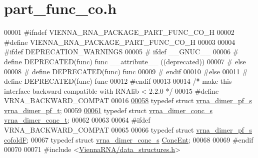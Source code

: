 \hypertarget{part__func__co_8h_source}{\section{part\+\_\+func\+\_\+co.\+h}
\label{part__func__co_8h_source}
}

\begin{DoxyCode}
00001 \textcolor{preprocessor}{#ifndef VIENNA\_RNA\_PACKAGE\_PART\_FUNC\_CO\_H}
00002 \textcolor{preprocessor}{#define VIENNA\_RNA\_PACKAGE\_PART\_FUNC\_CO\_H}
00003 
00004 \textcolor{preprocessor}{#ifdef DEPRECATION\_WARNINGS}
00005 \textcolor{preprocessor}{# ifdef \_\_GNUC\_\_}
00006 \textcolor{preprocessor}{#  define DEPRECATED(func) func \_\_attribute\_\_ ((deprecated))}
00007 \textcolor{preprocessor}{# else}
00008 \textcolor{preprocessor}{#  define DEPRECATED(func) func}
00009 \textcolor{preprocessor}{# endif}
00010 \textcolor{preprocessor}{#else}
00011 \textcolor{preprocessor}{# define DEPRECATED(func) func}
00012 \textcolor{preprocessor}{#endif}
00013 
00014 \textcolor{comment}{/* make this interface backward compatible with RNAlib < 2.2.0 */}
00015 \textcolor{preprocessor}{#define VRNA\_BACKWARD\_COMPAT}
00016 
\hypertarget{part__func__co_8h_source_l00058}{}\hyperlink{group__pf__cofold_ga444df1587c9a2ca15b8eb25188f629c3}{00058} \textcolor{keyword}{typedef} \textcolor{keyword}{struct }\hyperlink{group__pf__cofold_structvrna__dimer__pf__s}{vrna\_dimer\_pf\_s}  \hyperlink{group__pf__cofold_structvrna__dimer__pf__s}{vrna\_dimer\_pf\_t};
00059 
\hypertarget{part__func__co_8h_source_l00061}{}\hyperlink{group__pf__cofold_gac48c2723444ecfdceafcfd525ca98322}{00061} \textcolor{keyword}{typedef} \textcolor{keyword}{struct }\hyperlink{group__pf__cofold_structvrna__dimer__conc__s}{vrna\_dimer\_conc\_s}  \hyperlink{group__pf__cofold_structvrna__dimer__conc__s}{vrna\_dimer\_conc\_t};
00062 
00063 
00064 \textcolor{preprocessor}{#ifdef VRNA\_BACKWARD\_COMPAT}
00065 
00066 \textcolor{keyword}{typedef} \textcolor{keyword}{struct }\hyperlink{group__pf__cofold_structvrna__dimer__pf__s}{vrna\_dimer\_pf\_s}    \hyperlink{group__pf__cofold_structvrna__dimer__pf__s}{cofoldF};
00067 \textcolor{keyword}{typedef} \textcolor{keyword}{struct }\hyperlink{group__pf__cofold_structvrna__dimer__conc__s}{vrna\_dimer\_conc\_s}  \hyperlink{group__pf__cofold_structvrna__dimer__conc__s}{ConcEnt};
00068 
00069 \textcolor{preprocessor}{#endif}
00070 
00071 \textcolor{preprocessor}{#include <\hyperlink{data__structures_8h}{ViennaRNA/data\_structures.h}>}

\end{DoxyCode}
